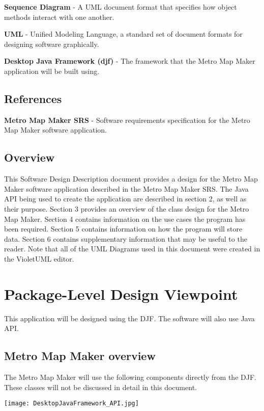 \documentclass[10pt,a4paper]{article}
\begin{document}
\textbf{Sequence Diagram} - A UML document format that specifies how object methods interact with one another. \newline

\textbf{UML} - Unified Modeling Language, a standard set of document formats for designing software graphically. \newline

\textbf{Desktop Java Framework (djf)} - The framework that the Metro Map Maker application will be built using.

\subsection{References}
\textbf{Metro Map Maker SRS} - Software requirements specification for the Metro Map Maker software application.

\subsection{Overview}
This Software Design Description document provides a design for the Metro Map Maker software application described in the Metro Map Maker SRS. The Java API being used to create the application are described in section 2, as well as their purpose. Section 3 provides an overview of the class design for the Metro Map Maker. Section 4 contains information on the use cases the program has been required. Section 5 contains information on how the program will store data. Section 6 contains supplementary information that may be useful to the reader. Note that all of the UML Diagrams used in this document were created in the VioletUML editor. \newpage

\section{Package-Level Design Viewpoint}
This application will be designed using the DJF. The software will also use Java API.

\subsection{Metro Map Maker overview}
The Metro Map Maker will use the following components directly from the DJF. These classes will not be discussed in detail in this document. \newline

\begin{center}
\texttt{[image: DesktopJavaFramework\_API.jpg]}
\end{center}
\end{document}
